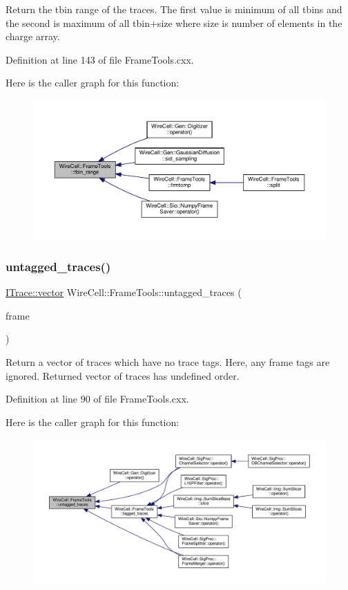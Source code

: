 Return the tbin range of the traces. The first value is minimum of all tbins and the second is maximum of all tbin+size where size is number of elements in the charge array. 

Definition at line 143 of file Frame\+Tools.\+cxx.

Here is the caller graph for this function\+:
\nopagebreak
\begin{figure}[H]
\begin{center}
\leavevmode
\includegraphics[width=350pt]{namespace_wire_cell_1_1_frame_tools_a9031f0d7465146236c47308c347d05a1_icgraph}
\end{center}
\end{figure}
\mbox{\label{namespace_wire_cell_1_1_frame_tools_ab39e5b3fae9cf0abda7e6795007ad6df}} 
\subsubsection{\texorpdfstring{untagged\+\_\+traces()}{untagged\_traces()}}
{\footnotesize\ttfamily \hyperlink{class_wire_cell_1_1_i_data_ae1a9f863380499bb43f39fabb6276660}{I\+Trace\+::vector} Wire\+Cell\+::\+Frame\+Tools\+::untagged\+\_\+traces (\begin{DoxyParamCaption}\item[{\hyperlink{class_wire_cell_1_1_i_data_aff870b3ae8333cf9265941eef62498bc}{I\+Frame\+::pointer}}]{frame }\end{DoxyParamCaption})}

Return a vector of traces which have no trace tags. Here, any frame tags are ignored. Returned vector of traces has undefined order. 

Definition at line 90 of file Frame\+Tools.\+cxx.

Here is the caller graph for this function\+:
\nopagebreak
\begin{figure}[H]
\begin{center}
\leavevmode
\includegraphics[width=350pt]{namespace_wire_cell_1_1_frame_tools_ab39e5b3fae9cf0abda7e6795007ad6df_icgraph}
\end{center}
\end{figure}
